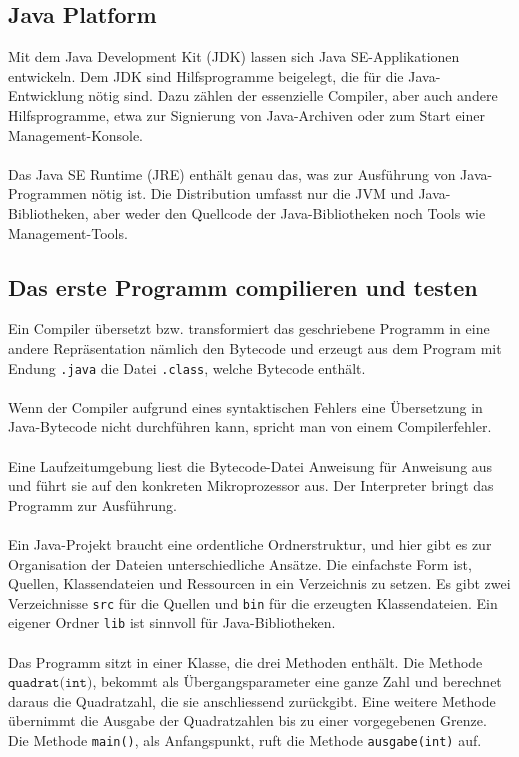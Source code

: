 \subsection{Java Platform}
Mit dem Java Development Kit (JDK) lassen sich Java SE-Applikationen entwickeln. Dem JDK sind Hilfsprogramme beigelegt, die für die Java-Entwicklung nötig sind. Dazu zählen der essenzielle Compiler, aber auch andere Hilfsprogramme, etwa zur Signierung von Java-Archiven oder zum Start einer Management-Konsole.
\\\\
Das Java SE Runtime (JRE) enthält genau das, was zur Ausführung von Java-Programmen nötig ist. Die Distribution umfasst nur die JVM und Java-Bibliotheken, aber weder den Quellcode der Java-Bibliotheken noch Tools wie Management-Tools.
\subsection{Das erste Programm compilieren und testen}

Ein Compiler übersetzt bzw. transformiert das geschriebene Programm in eine andere Repräsentation nämlich den Bytecode und erzeugt aus dem Program mit Endung \texttt{.java} die Datei \texttt{.class}, welche Bytecode enthält.
\\\\
Wenn der Compiler aufgrund eines syntaktischen Fehlers eine Übersetzung in Java-Bytecode nicht durchführen kann, spricht man von einem Compilerfehler.
\\\\
Eine Laufzeitumgebung liest die Bytecode-Datei Anweisung für Anweisung aus und führt sie auf den konkreten Mikroprozessor aus. Der Interpreter bringt das Programm zur Ausführung.
\\\\
Ein Java-Projekt braucht eine ordentliche Ordnerstruktur, und hier gibt es zur Organisation der Dateien unterschiedliche Ansätze. Die einfachste Form ist, Quellen, Klassendateien und Ressourcen in ein Verzeichnis zu setzen. Es gibt zwei Verzeichnisse \texttt{src} für die Quellen und \texttt{bin} für die erzeugten Klassendateien. Ein eigener Ordner \texttt{lib} ist sinnvoll für Java-Bibliotheken.
\\\\
Das Programm sitzt in einer Klasse, die drei Methoden enthält. Die Methode $\texttt{quadrat(int)}$, bekommt als Übergangsparameter eine ganze Zahl und berechnet daraus die Quadratzahl, die sie anschliessend zurückgibt. Eine weitere Methode übernimmt die Ausgabe der Quadratzahlen bis zu einer vorgegebenen Grenze. Die Methode \texttt{main()}, als Anfangspunkt, ruft die Methode \texttt{ausgabe(int)} auf.

